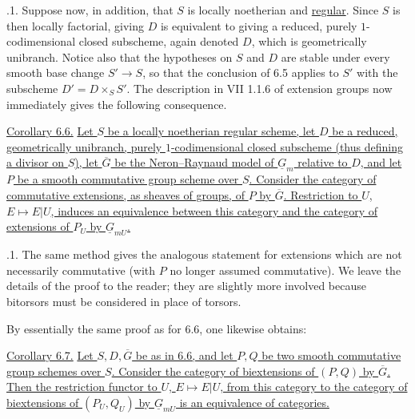 \medskip
{}.1.  Suppose now, in addition, that $S$ is locally noetherian
and \underline{regular}.  Since $S$ is then locally factorial, giving $D$
is equivalent to giving a reduced, purely $1$-codimensional closed
subscheme, again denoted $D$, which is geometrically unibranch.  Notice also
that the hypotheses on $S$ and $D$ are stable under every smooth base change
$S'\to S$, so that the conclusion of 6.5 applies to $S'$ with the subscheme
$D'=D\times_S S'$.  The description in VII 1.1.6 of extension groups now
immediately gives the following consequence.

\medskip
\noindent\underline{Corollary 6.6.}  \underline{Let $S$ be a locally
noetherian regular scheme, let $D$ be a reduced, geometrically unibranch,
purely $1$-codimensional closed subscheme (thus defining a divisor on $S$),
let $\overline G$ be the Neron--Raynaud model of $\underline G_m$ relative
to $D$, and let $P$ be a smooth commutative group scheme over $S$.  Consider
the category of commutative extensions, as sheaves of groups, of $P$ by
$\overline G$.  Restriction to $U$, $E\mapsto E|U$, induces an equivalence
between this category and the category of extensions of $P_U$ by
$\underline G_{mU}$.}

\medskip
{}.1.  The same method gives the analogous statement for
extensions which are not necessarily commutative (with $P$ no longer
assumed commutative).  We leave the details of the proof to the reader; they
are slightly more involved because bitorsors must be considered in place of
torsors.

By essentially the same proof as for 6.6, one likewise obtains:

\medskip
\noindent\underline{Corollary 6.7.}  \underline{Let $S,D,\overline G$ be as
in 6.6, and let $P,Q$ be two smooth commutative group schemes over $S$.
Consider the category of biextensions of $(P,Q)$ by $\overline G$.  Then the
restriction functor to $U$, $E\mapsto E|U$, from this category to the
category of biextensions of $(P_U,Q_U)$ by $\underline G_{mU}$ is an
equivalence of categories.}

